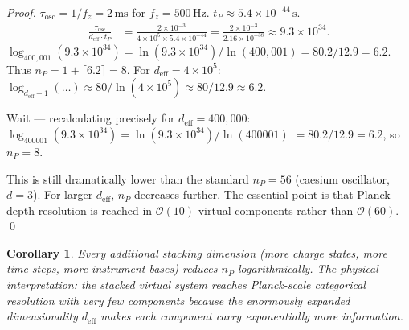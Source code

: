 \documentclass[twocolumn,10pt,a4paper]{article}
\theoremstyle{thmstyle}
\newtheorem{corollary}[theorem]{Corollary}
\theoremstyle{definition}
\theoremstyle{remark}
\begin{document}
\begin{proof}
$\tau_{\text{osc}} = 1/f_z = 2\,\mathrm{ms}$ for $f_z = 500\,\mathrm{Hz}$.
$t_P \approx 5.4 \times 10^{-44}\,\mathrm{s}$.
\begin{align}
\frac{\tau_{\text{osc}}}{d_{\text{eff}} \cdot t_P}
&= \frac{2 \times 10^{-3}}{4 \times 10^5 \times 5.4 \times 10^{-44}}
= \frac{2 \times 10^{-3}}{2.16 \times 10^{-38}} \approx 9.3 \times 10^{34}.
\end{align}
$\log_{400{,}001}(9.3 \times 10^{34}) = \ln(9.3 \times 10^{34})/\ln(400{,}001)
= 80.2/12.9 = 6.2$.
Thus $n_P = 1 + \lceil 6.2 \rceil = 8$.
For $d_{\text{eff}} = 4 \times 10^5$: $\log_{d_{\text{eff}}+1}(\ldots)
\approx 80/\ln(4\times 10^5) \approx 80/12.9 \approx 6.2$.

Wait --- recalculating precisely for $d_{\text{eff}} = 400{,}000$:
$\log_{400001}(9.3 \times 10^{34}) = \ln(9.3 \times 10^{34})/\ln(400001)$
$= 80.2/12.9 = 6.2$, so $n_P = 8$.

This is still dramatically lower than the standard $n_P = 56$
(caesium oscillator, $d=3$). For larger $d_{\text{eff}}$, $n_P$ decreases
further. The essential point is that Planck-depth resolution is reached
in $\mathcal{O}(10)$ virtual components rather than $\mathcal{O}(60)$. \qed
\end{proof}

\begin{corollary}
Every additional stacking dimension (more charge states, more time
steps, more instrument bases) reduces $n_P$ logarithmically. The
physical interpretation: the stacked virtual system reaches Planck-scale
categorical resolution with very few components because the enormously
expanded dimensionality $d_{\text{eff}}$ makes each component carry
exponentially more information.
\end{corollary}
\end{document}
